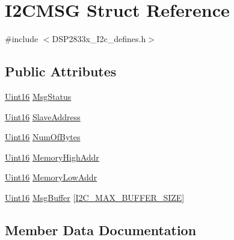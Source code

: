 \hypertarget{struct_i2_c_m_s_g}{}\section{I2\+C\+M\+S\+G Struct Reference}
\label{struct_i2_c_m_s_g}


{\ttfamily \#include $<$D\+S\+P2833x\+\_\+\+I2c\+\_\+defines.\+h$>$}

\subsection*{Public Attributes}
\begin{DoxyCompactItemize}
\item 
\hyperlink{_d_s_p2833x___device_8h_a59a9f6be4562c327cbfb4f7e8e18f08b}{Uint16} \hyperlink{struct_i2_c_m_s_g_a22d7285b8657bb4f0f338f986d3539c7}{Msg\+Status}
\item 
\hyperlink{_d_s_p2833x___device_8h_a59a9f6be4562c327cbfb4f7e8e18f08b}{Uint16} \hyperlink{struct_i2_c_m_s_g_a540fef1ef283511a75046b8dabbbac39}{Slave\+Address}
\item 
\hyperlink{_d_s_p2833x___device_8h_a59a9f6be4562c327cbfb4f7e8e18f08b}{Uint16} \hyperlink{struct_i2_c_m_s_g_a41dc94d544dabce8108488030a92da60}{Num\+Of\+Bytes}
\item 
\hyperlink{_d_s_p2833x___device_8h_a59a9f6be4562c327cbfb4f7e8e18f08b}{Uint16} \hyperlink{struct_i2_c_m_s_g_a64e5959ad9bcda0fe2c0aa5e13343461}{Memory\+High\+Addr}
\item 
\hyperlink{_d_s_p2833x___device_8h_a59a9f6be4562c327cbfb4f7e8e18f08b}{Uint16} \hyperlink{struct_i2_c_m_s_g_a12bf2f3766ce5eea6eb15ee8af2fad47}{Memory\+Low\+Addr}
\item 
\hyperlink{_d_s_p2833x___device_8h_a59a9f6be4562c327cbfb4f7e8e18f08b}{Uint16} \hyperlink{struct_i2_c_m_s_g_a55a1f031763e58f89d5a6fb8b63a3aad}{Msg\+Buffer} \mbox{[}\hyperlink{_d_s_p2833x___i2c__defines_8h_a0889ccb6e4a98d6d8a0bf7c009c818e2}{I2\+C\+\_\+\+M\+A\+X\+\_\+\+B\+U\+F\+F\+E\+R\+\_\+\+S\+I\+Z\+E}\mbox{]}
\end{DoxyCompactItemize}


\subsection{Member Data Documentation}
\hypertarget{struct_i2_c_m_s_g_a64e5959ad9bcda0fe2c0aa5e13343461}{}
